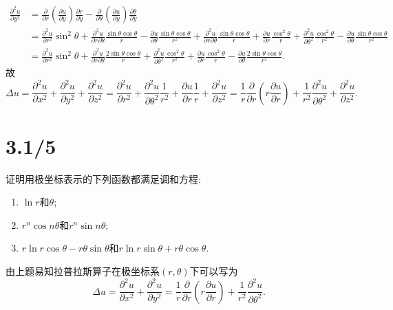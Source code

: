 \documentclass[11pt,a4paper]{article}
\begin{document}
\begin{align*}
  \frac{\partial^2u}{\partial y^2}
   & =\frac{\partial}{\partial r}\left(\frac{\partial u}{\partial y}\right)\frac{\partial r}{\partial y}-\frac{\partial}{\partial\theta}\left(\frac{\partial u}{\partial y}\right)\frac{\partial\theta}{\partial y}                                                                                                 \\
   & =\frac{\partial^2u}{\partial r^2}\sin^2\theta+\frac{\partial^2u}{\partial r\partial\theta}\frac{\sin\theta\cos\theta}{r}-\frac{\partial u}{\partial\theta}\frac{\sin\theta\cos\theta}{r^2}
  +\frac{\partial^2u}{\partial r\partial\theta}\frac{\sin\theta\cos\theta}{r}+\frac{\partial u}{\partial r}\frac{\cos^2\theta}{r}+\frac{\partial^2u}{\partial\theta^2}\frac{\cos^2\theta}{r^2}-\frac{\partial u}{\partial\theta}\frac{\sin\theta\cos\theta}{r^2}                                                    \\
   & =\frac{\partial^2u}{\partial r^2}\sin^2\theta+\frac{\partial^2u}{\partial r\partial\theta}\frac{2\sin\theta\cos\theta}{r}+\frac{\partial^2u}{\partial\theta^2}\frac{\cos^2\theta}{r^2}+\frac{\partial u}{\partial r}\frac{\cos^2\theta}{r}-\frac{\partial u}{\partial\theta}\frac{2\sin\theta\cos\theta}{r^2}.
\end{align*}
故
$$\Delta u=\frac{\partial^2u}{\partial x^2}+\frac{\partial^2u}{\partial y^2}+\frac{\partial^2u}{\partial z^2}
  =\frac{\partial^2u}{\partial r^2}+\frac{\partial^2u}{\partial\theta^2}\frac{1}{r^2}+\frac{\partial u}{\partial r}\frac{1}{r}+\frac{\partial^2u}{\partial z^2}
  =\frac{1}{r}\frac{\partial}{\partial r}\left(r\frac{\partial u}{\partial r}\right)+\frac{1}{r^2}\frac{\partial^2u}{\partial\theta^2}+\frac{\partial^2u}{\partial z^2}.$$

\section{3.1/5}
证明用极坐标表示的下列函数都满足调和方程:
\begin{problem}
\begin{enumerate}
  \item $\ln r$和$\theta$;
  \item $r^n\cos n\theta$和$r^n\sin n\theta$;
  \item $r\ln r\cos\theta-r\theta\sin\theta$和$r\ln r\sin\theta+r\theta\cos\theta$.
\end{enumerate}
\end{problem}

由上题易知拉普拉斯算子在极坐标系$(r,\theta)$下可以写为
$$\Delta u=\frac{\partial^2u}{\partial x^2}+\frac{\partial^2u}{\partial y^2}=\frac{1}{r}\frac{\partial}{\partial r}\left(r\frac{\partial u}{\partial r}\right)+\frac{1}{r^2}\frac{\partial^2u}{\partial\theta^2}.$$
\end{document}
